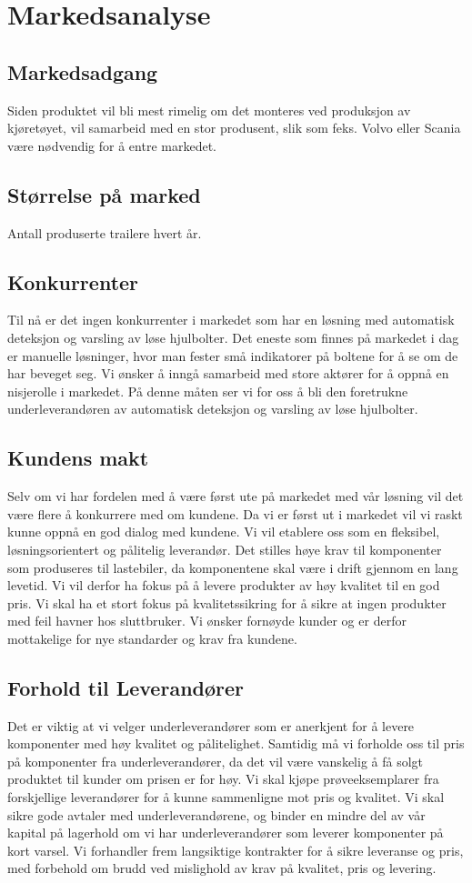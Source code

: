 \chapter{Markedsanalyse}
\section{Markedsadgang}
Siden produktet vil bli mest rimelig om det monteres ved produksjon av kjøretøyet, vil  samarbeid med en stor produsent, slik som feks. Volvo eller Scania være nødvendig for å entre markedet. 
\section{Størrelse på marked}
Antall produserte trailere hvert år.
\section{Konkurrenter}
Til nå er det ingen konkurrenter i markedet som har en løsning med  automatisk deteksjon og varsling av løse hjulbolter. Det eneste som finnes på markedet i dag er manuelle løsninger, hvor man fester små indikatorer på boltene for å se om de har beveget seg. 
Vi ønsker å inngå samarbeid med store aktører for å oppnå en nisjerolle i markedet. På denne måten ser vi for oss å bli den foretrukne underleverandøren av automatisk deteksjon og varsling av løse hjulbolter.
\section{Kundens makt}
Selv om vi har fordelen med å være først ute på markedet med vår løsning vil det være flere å konkurrere med om kundene. Da vi er først ut i markedet vil vi raskt kunne oppnå en god dialog med kundene. Vi vil etablere oss som en fleksibel, løsningsorientert og pålitelig leverandør. Det stilles høye krav til komponenter som produseres til lastebiler, da komponentene skal være i drift gjennom en lang levetid. Vi vil derfor ha fokus på å levere produkter av høy kvalitet til en god pris. Vi skal ha et stort fokus på kvalitetssikring for å sikre at ingen produkter med feil havner hos sluttbruker. Vi ønsker fornøyde kunder og er derfor mottakelige for nye standarder og krav fra kundene. 
\section{Forhold til Leverandører}
Det er viktig at vi velger underleverandører som er anerkjent for å levere komponenter med høy kvalitet og pålitelighet. Samtidig må vi forholde oss til pris på komponenter fra underleverandører, da det vil være vanskelig å få solgt produktet til kunder om prisen er for høy. Vi skal kjøpe prøveeksemplarer fra forskjellige leverandører for å kunne sammenligne mot pris og kvalitet. Vi skal sikre gode avtaler med underleverandørene, og binder en mindre del av vår kapital på lagerhold om vi har underleverandører som leverer komponenter på kort varsel. Vi forhandler frem langsiktige kontrakter for å sikre leveranse og pris, med forbehold om brudd ved mislighold av krav på kvalitet, pris og levering. 
